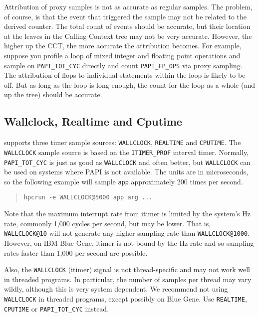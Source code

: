 Attribution of proxy samples is not as accurate as regular samples.
The problem, of course, is that the event that triggered the sample
may not be related to the derived counter.  The total count of events
should be accurate, but their location at the leaves in the Calling
Context tree may not be very accurate.  However, the higher up the
CCT, the more accurate the attribution becomes.  For example, suppose
you profile a loop of mixed integer and floating point operations and
sample on \verb|PAPI_TOT_CYC| directly and count \verb|PAPI_FP_OPS|
via proxy sampling.  The attribution of flops to individual statements
within the loop is likely to be off.  But as long as the loop is long
enough, the count for the loop as a whole (and up the tree) should be
accurate.

\subsection{Wallclock, Realtime and Cputime}

\HPCToolkit{} supports three timer sample sources: \verb|WALLCLOCK|,
\verb|REALTIME| and \verb|CPUTIME|.
The \verb|WALLCLOCK| sample source is based on the \verb|ITIMER_PROF|
interval timer.  Normally, \verb|PAPI_TOT_CYC| is just as good as
\verb|WALLCLOCK| and often better, but \verb|WALLCLOCK| can be used on
systems where PAPI is not available.  The units are in microseconds,
so the following example will sample \verb|app| approximately 200
times per second.

\begin{quote}
\begin{verbatim}
hpcrun -e WALLCLOCK@5000 app arg ...
\end{verbatim}
\end{quote}

Note that the maximum interrupt rate from itimer is limited by the
system's Hz rate, commonly 1,000 cycles per second, but may be lower.
That is, \verb|WALLCLOCK@10| will not generate any higher sampling rate
than \verb|WALLCLOCK@1000|.  However, on IBM Blue Gene, itimer is not
bound by the Hz rate and so sampling rates faster than 1,000 per
second are possible.

Also, the \verb|WALLCLOCK| (itimer) signal is not thread-specific and
may not work well in threaded programs.  In particular, the number of
samples per thread may vary wildly, although this is very system
dependent.  We recommend not using \verb|WALLCLOCK| in threaded
programs, except possibly on Blue Gene.  Use \verb|REALTIME|,
\verb|CPUTIME| or \verb|PAPI_TOT_CYC| instead.

